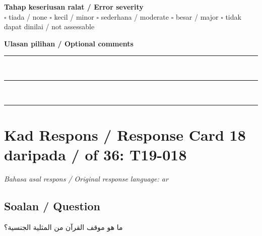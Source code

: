 \documentclass[11pt,a4paper]{article}
\newcommand{\ar}[1]{{\arabicfont #1}}
\begin{document}
\medskip
\textbf{Tahap keseriusan ralat / Error severity}\\
$\square$ tiada / none \quad $\square$ kecil / minor \quad $\square$ sederhana / moderate \quad
$\square$ besar / major \quad $\square$ tidak dapat dinilai / not assessable

\medskip
\textbf{Ulasan pilihan / Optional comments}\\[3pt]
\rule{\textwidth}{0.4pt}\\[16pt]
\rule{\textwidth}{0.4pt}\\[16pt]
\rule{\textwidth}{0.4pt}

\newpage
\section*{Kad Respons / Response Card 18 daripada / of 36: T19-018}
\textit{Bahasa asal respons / Original response language: ar}

\subsection*{Soalan / Question}
\ar{ما} \ar{هو} \ar{موقف} \ar{القرآن} \ar{من} \ar{المثلية} \ar{الجنسية؟}
\end{document}
